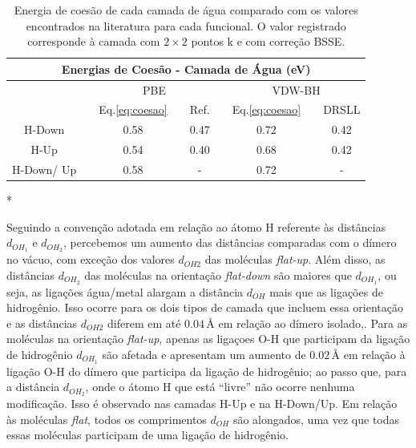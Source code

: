 \begin{table}[b!]
	\centering
	\caption{Energia de coesão de cada camada de água comparado com os valores encontrados na literatura para cada funcional. O valor registrado corresponde à camada com $2\times2$ pontos k e com correção BSSE.\label{tab:coesao}}
	\begin{threeparttable}
		\begin{tabular}{ccccccccc} 
			\hline\hline
			\multicolumn{9}{c}{\textbf{Energias de Coesão - Camada de Água (eV})}       \\ 
			\midrule
			&  & \multicolumn{3}{c}{PBE} &  & \multicolumn{3}{c}{VDW-BH}  \\ 
			\cmidrule{3-5}\cmidrule{7-9}
			&  & Eq.\eqref{eq:coesao}  &  & Ref.\tnote{*}       &  & Eq.\eqref{eq:coesao}  &  & DRSLL\tnote{*}    \\ 
			\midrule
			H-Down         &  & 0.58 &  & 0.47        &  & 0.72 &  & 0.42           \\
			H-Up           &  & 0.54 &  & 0.40          &  & 0.68 &  & 0.42           \\
			H-Down/ Up &  & 0.58 &  & -             &  & 0.72 &  & -              \\
			\hline\hline
		\end{tabular}
		\begin{tablenotes}\footnotesize
			\item[*] \citeauthor{adrien}
		\end{tablenotes}
	\end{threeparttable}
\end{table}


Seguindo a convenção adotada em relação ao átomo H referente às distâncias ${d_{OH_1}}$ e ${d_{OH_2}}$, percebemos um aumento das distâncias comparadas com o dímero no vácuo, com exceção dos valores $ d_{OH2} $ das moléculas \textit{flat-up}. Além disso, as distâncias ${d_{OH_2}}$ das moléculas na orientação  \textit{flat-down} são maiores que ${d_{OH_1}}$, ou seja, as ligações água/metal alargam a distância $d_{OH}$ mais que as ligações de hidrogênio. Isso ocorre para os dois tipos de camada que incluem essa orientação e as distâncias $ d_{OH2} $ diferem em até $ 0.04\,\si{\angstrom} $ em relação ao dímero isolado,. Para as moléculas na orientação \textit{flat-up}, apenas as ligaçoes O-H que participam da ligação de hidrogênio ${d_{OH_1}}$ são afetada e apresentam um aumento de $ 0.02\,\si{\angstrom} $ em relação à ligação O-H do dímero que participa da ligação de hidrogênio; ao passo que, para a distância ${d_{OH_2}}$, onde o átomo H que está ``livre'' não ocorre nenhuma modificação. Isso é observado nas camadas H-Up e na H-Down/Up. Em relação às moléculas \textit{flat}, todos os comprimentos ${d_{OH}}$ são alongados, uma vez que todas essas moléculas participam de uma ligação de hidrogênio. %

